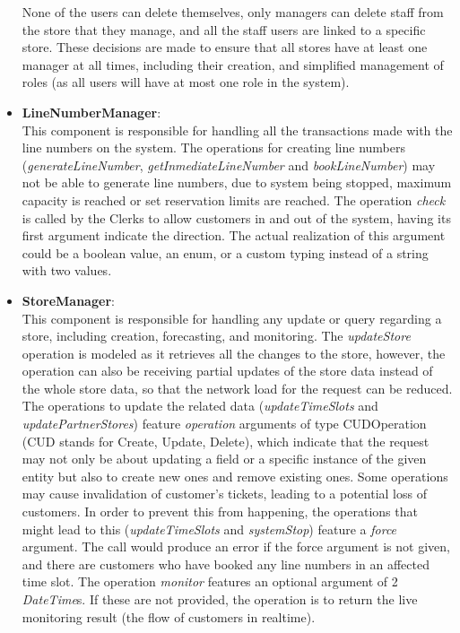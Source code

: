 \begin{itemize}
    None of the users can delete themselves, only managers can delete staff from the store that they manage, and all the staff users are linked to a specific store.
    These decisions are made to ensure that all stores have at least one manager at all times, including their creation, and simplified management of roles (as all users will have at most one role in the system).
    \item \textbf{LineNumberManager}: \\
    This component is responsible for handling all the transactions made with the line numbers on the system.
    The operations for creating line numbers (\textit{generateLineNumber}, \textit{getInmediateLineNumber} and \textit{bookLineNumber}) may not be able to generate line numbers, due to system being stopped, maximum capacity is reached or set reservation limits are reached.
    The operation \textit{check} is called by the Clerks to allow customers in and out of the system, having its first argument indicate the direction.
    The actual realization of this argument could be a boolean value, an enum, or a custom typing instead of a string with two values.
    \item \textbf{StoreManager}: \\
    This component is responsible for handling any update or query regarding a store, including creation, forecasting, and monitoring.
    The \textit{updateStore} operation is modeled as it retrieves all the changes to the store, however, the operation can also be receiving partial updates of the store data instead of the whole store data, so that the network load for the request can be reduced.
    The operations to update the related data (\textit{updateTimeSlots} and \textit{updatePartnerStores}) feature \textit{operation} arguments of type CUDOperation (CUD stands for Create, Update, Delete), which indicate that the request may not only be about updating a field or a specific instance of the given entity but also to create new ones and remove existing ones.
    Some operations may cause invalidation of customer's tickets, leading to a potential loss of customers.
    In order to prevent this from happening, the operations that might lead to this (\textit{updateTimeSlots} and \textit{systemStop}) feature a \textit{force} argument.
    The call would produce an error if the force argument is not given, and there are customers who have booked any line numbers in an affected time slot.
    The operation \textit{monitor} features an optional argument of 2 \textit{DateTime}s.
    If these are not provided, the operation is to return the live monitoring result (the flow of customers in realtime).
\end{itemize}

